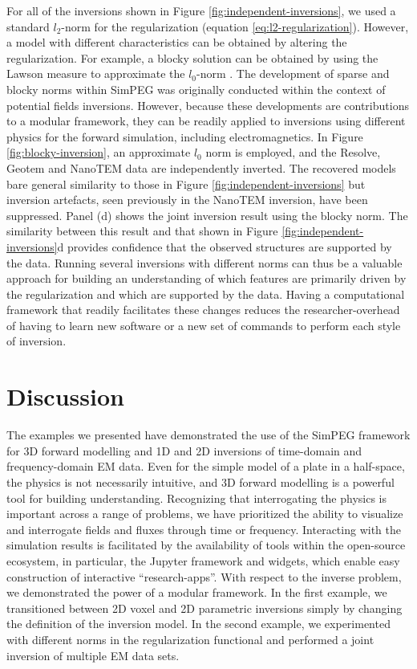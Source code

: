 \documentclass[paper]{geophysics}
\begin{document}
For all of the inversions shown in Figure \ref{fig:independent-inversions}, we used a standard $l_2$-norm for the regularization (equation \ref{eq:l2-regularization}). However, a model with different characteristics can be obtained by altering the regularization. For example, a blocky solution can be obtained by using the Lawson measure to approximate the $l_0$-norm \citep{Fournier2016, Lawson1961}. The development of sparse and blocky norms within SimPEG was originally conducted within the context of potential fields inversions. However, because  these developments are contributions to a modular framework, they can be readily applied to inversions using different physics for the forward simulation, including electromagnetics. In Figure \ref{fig:blocky-inversion}, an approximate $l_0$ norm is employed, and the Resolve, Geotem and NanoTEM data are independently inverted. The recovered models bare general similarity to those in Figure \ref{fig:independent-inversions} but inversion artefacts, seen previously in the NanoTEM inversion, have been suppressed. Panel (d) shows the joint inversion result using the blocky norm. The similarity between this result and that shown in Figure \ref{fig:independent-inversions}d provides confidence that the observed structures are supported by the data. Running several inversions with different norms can thus be a valuable approach for building an understanding of which features are primarily driven by the regularization and which are supported by the data. Having a computational framework that readily facilitates these changes reduces the researcher-overhead of having to learn new software or a new set of commands to perform each style of inversion.






\section{Discussion}

The examples we presented have demonstrated the use of the SimPEG framework for 3D forward modelling and 1D and 2D inversions of time-domain and frequency-domain EM data. Even for the simple model of a plate in a half-space, the physics is not necessarily intuitive, and 3D forward modelling is a powerful tool for building understanding. Recognizing that interrogating the physics is important across a range of problems, we have prioritized the ability to visualize and interrogate fields and fluxes through time or frequency. Interacting with the simulation results is facilitated by the availability of tools within the open-source ecosystem, in particular, the Jupyter framework and widgets, which enable easy construction of interactive ``research-apps''. With respect to the inverse problem, we demonstrated the power of a modular framework. In the first example, we transitioned between 2D voxel and 2D parametric inversions simply by changing the definition of the inversion model. In the second example, we experimented with different norms in the regularization functional and performed a joint inversion of multiple EM data sets.
\end{document}
